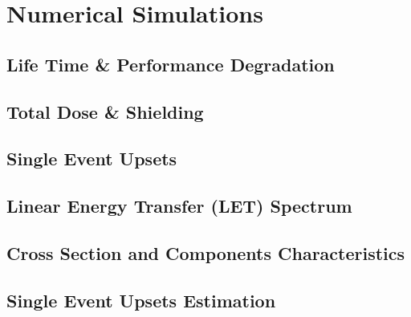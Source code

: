 
\section{\label{sec:simulations}Numerical Simulations}

\subsection{\label{subsec:life}Life Time \& Performance Degradation}


\subsection{\label{subsec:shield}Total Dose \& Shielding}


\subsection{\label{subsec:SEU}Single Event Upsets}


\subsection{\label{subsec:let}Linear Energy Transfer (LET) Spectrum}


\subsection{\label{subsec:CSCC}Cross Section and Components Characteristics}

\subsection{\label{subsec:SEU-esti}Single Event Upsets Estimation}
